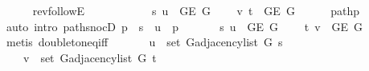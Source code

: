 \begin{isabellebody}
\ \ \ \ \isamarkupfalse%
\ rev{\isacharunderscore}{\kern0pt}followE\isanewline
\ \ \ \ \isacommand{{\isachardot}{\kern0pt}}\isamarkupfalse%
\isanewline
\ \ \isamarkupfalse%
\isanewline
\ \ \ \ {\isachardoublequoteopen}{\isacharbraceleft}{\kern0pt}s{\isacharcomma}{\kern0pt}\ u{\isacharbraceright}{\kern0pt}\ {\isasymin}\ {\isacharparenleft}{\kern0pt}G{\isachardot}{\kern0pt}E\ {\isacharquery}{\kern0pt}G{\isacharparenright}{\kern0pt}{\isachardoublequoteclose}\isanewline
\ \ \ \ {\isachardoublequoteopen}{\isacharbraceleft}{\kern0pt}v{\isacharcomma}{\kern0pt}\ t{\isacharbraceright}{\kern0pt}\ {\isasymin}\ {\isacharparenleft}{\kern0pt}G{\isachardot}{\kern0pt}E\ {\isacharquery}{\kern0pt}G{\isacharparenright}{\kern0pt}{\isachardoublequoteclose}\isanewline
\ \ \ \ \isamarkupfalse%
\ path{\isacharunderscore}{\kern0pt}p\isanewline
\ \ \ \ \isamarkupfalse%
\ {\isacharparenleft}{\kern0pt}auto\ intro{\isacharcolon}{\kern0pt}\ path{\isacharunderscore}{\kern0pt}snocD{\isacharbrackleft}{\kern0pt}\ {\isacharquery}{\kern0pt}p\ {\isacharequal}{\kern0pt}\ {\isachardoublequoteopen}s\ {\isacharhash}{\kern0pt}\ u\ {\isacharhash}{\kern0pt}\ p{\isachardoublequoteclose}{\isacharbrackright}{\kern0pt}{\isacharparenright}{\kern0pt}\isanewline
\ \ \isamarkupfalse%
\isanewline
\ \ \ \ {\isachardoublequoteopen}{\isacharbraceleft}{\kern0pt}s{\isacharcomma}{\kern0pt}\ u{\isacharbraceright}{\kern0pt}\ {\isasymin}\ {\isacharparenleft}{\kern0pt}G{\isachardot}{\kern0pt}E\ {\isacharquery}{\kern0pt}G{\isacharparenright}{\kern0pt}{\isachardoublequoteclose}\isanewline
\ \ \ \ {\isachardoublequoteopen}{\isacharbraceleft}{\kern0pt}t{\isacharcomma}{\kern0pt}\ v{\isacharbraceright}{\kern0pt}\ {\isasymin}\ {\isacharparenleft}{\kern0pt}G{\isachardot}{\kern0pt}E\ {\isacharquery}{\kern0pt}G{\isacharparenright}{\kern0pt}{\isachardoublequoteclose}\isanewline
\ \ \ \ \isamarkupfalse%
\ {\isacharparenleft}{\kern0pt}metis\ doubleton{\isacharunderscore}{\kern0pt}eq{\isacharunderscore}{\kern0pt}iff{\isacharparenright}{\kern0pt}{\isacharplus}{\kern0pt}\isanewline
\ \ \isamarkupfalse%
\isanewline
\ \ \ \ {\isachardoublequoteopen}u\ {\isasymin}\ set\ {\isacharparenleft}{\kern0pt}G{\isachardot}{\kern0pt}adjacency{\isacharunderscore}{\kern0pt}list\ {\isacharquery}{\kern0pt}G\ s{\isacharparenright}{\kern0pt}{\isachardoublequoteclose}\isanewline
\ \ \ \ {\isachardoublequoteopen}v\ {\isasymin}\ set\ {\isacharparenleft}{\kern0pt}G{\isachardot}{\kern0pt}adjacency{\isacharunderscore}{\kern0pt}list\ {\isacharquery}{\kern0pt}G\ t{\isacharparenright}{\kern0pt}{\isachardoublequoteclose}\isanewline

\end{isabellebody}
